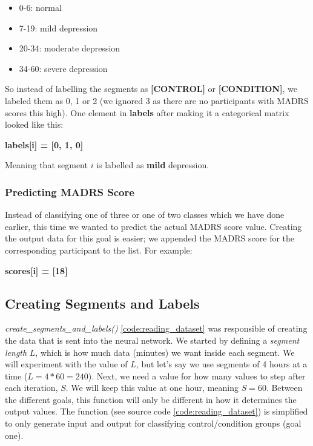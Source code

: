\begin{itemize}
  \item 0-6: normal
  \item 7-19: mild depression
  \item 20-34: moderate depression
  \item 34-60: severe depression
\end{itemize}

So instead of labelling the segments as \textbf{[CONTROL]} or \textbf{[CONDITION]}, we labeled them as 0, 1 or 2 (we ignored 3 as there are no participants with MADRS scores this high). One element in \textbf{labels} after making it a categorical matrix looked like this:

\textbf{labels[i] = [0, 1, 0]}

\noindent Meaning that segment $i$ is labelled as \textbf{mild} depression.

\subsubsection{Predicting MADRS Score}

Instead of classifying one of three or one of two classes which we have done earlier, this time we wanted to predict the actual MADRS score value. Creating the output data for this goal is easier; we appended the MADRS score for the corresponding participant to the list. For example:

\textbf{scores[i] = [18]}

\subsection{Creating Segments and Labels}
\textit{create\_segments\_and\_labels()} \ref{code:reading_dataset} was responsible of creating the data that is sent into the neural network. We started by defining a \textit{segment length} $L$, which is how much data (minutes) we want inside each segment. We will experiment with the value of $L$, but let's say we use segments of 4 hours at a time ($L=4*60=240$). Next, we need a value for how many values to step after each iteration, $S$. We will keep this value at one hour, meaning $S=60$. Between the different goals, this function will only be different in how it determines the output values. The function (see source code \ref{code:reading_dataset}) is simplified to only generate input and output for classifying control/condition groups (goal one).

